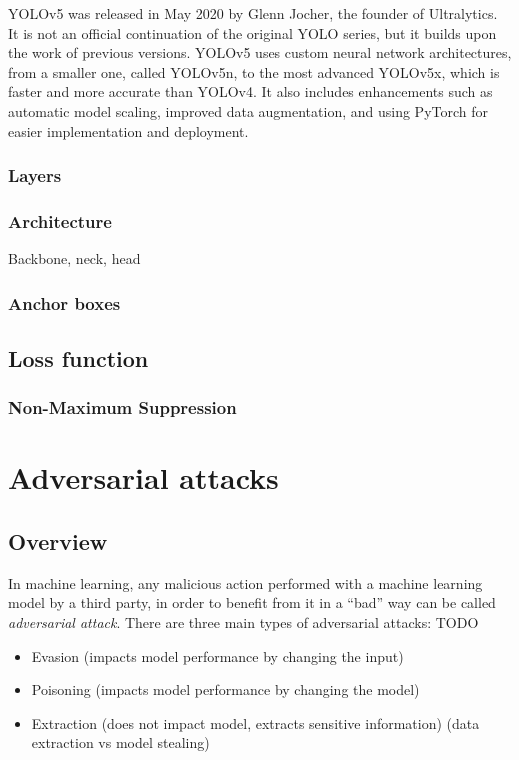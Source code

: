 \documentclass[14pt,a4paper]{extarticle}
\newcounter{e}
\numberwithin{equation}{section}
\numberwithin{figure}{section}
\begin{document}
YOLOv5 was released in May 2020 by Glenn Jocher, the founder of Ultralytics. It is not an official continuation of the original YOLO series, but it builds upon the work of previous versions. YOLOv5 uses custom neural network architectures, from a smaller one, called YOLOv5n, to the most advanced YOLOv5x, which is faster and more accurate than YOLOv4. It also includes enhancements such as automatic model scaling, improved data augmentation, and using PyTorch for easier implementation and deployment.
        \subsubsection{Layers}
        \subsubsection{Architecture}
        Backbone, neck, head

        \subsubsection{Anchor boxes}
        \subsection{Loss function}
        
        \subsubsection{Non-Maximum Suppression}

\newpage
\thispagestyle{empty}
\section{Adversarial attacks}
\subsection{Overview}
In machine learning, any malicious action performed with a machine learning model by a third party, in order to benefit from it in a ``bad'' way can be called \textit{adversarial attack}.
There are three main types of adversarial attacks:
TODO
\begin{itemize}
    \item Evasion (impacts model performance by changing the input)
    \item Poisoning (impacts model performance by changing the model)
    \item Extraction (does not impact model, extracts sensitive information) (data extraction vs model stealing)
\end{itemize}
\end{document}
